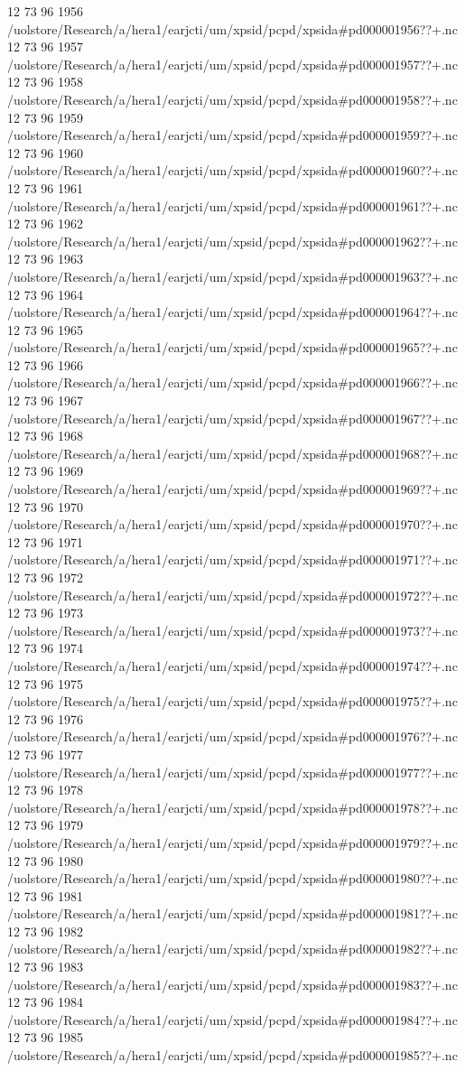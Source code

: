 12 73 96
1956
/uolstore/Research/a/hera1/earjcti/um/xpsid/pcpd/xpsida#pd000001956??+.nc
12 73 96
1957
/uolstore/Research/a/hera1/earjcti/um/xpsid/pcpd/xpsida#pd000001957??+.nc
12 73 96
1958
/uolstore/Research/a/hera1/earjcti/um/xpsid/pcpd/xpsida#pd000001958??+.nc
12 73 96
1959
/uolstore/Research/a/hera1/earjcti/um/xpsid/pcpd/xpsida#pd000001959??+.nc
12 73 96
1960
/uolstore/Research/a/hera1/earjcti/um/xpsid/pcpd/xpsida#pd000001960??+.nc
12 73 96
1961
/uolstore/Research/a/hera1/earjcti/um/xpsid/pcpd/xpsida#pd000001961??+.nc
12 73 96
1962
/uolstore/Research/a/hera1/earjcti/um/xpsid/pcpd/xpsida#pd000001962??+.nc
12 73 96
1963
/uolstore/Research/a/hera1/earjcti/um/xpsid/pcpd/xpsida#pd000001963??+.nc
12 73 96
1964
/uolstore/Research/a/hera1/earjcti/um/xpsid/pcpd/xpsida#pd000001964??+.nc
12 73 96
1965
/uolstore/Research/a/hera1/earjcti/um/xpsid/pcpd/xpsida#pd000001965??+.nc
12 73 96
1966
/uolstore/Research/a/hera1/earjcti/um/xpsid/pcpd/xpsida#pd000001966??+.nc
12 73 96
1967
/uolstore/Research/a/hera1/earjcti/um/xpsid/pcpd/xpsida#pd000001967??+.nc
12 73 96
1968
/uolstore/Research/a/hera1/earjcti/um/xpsid/pcpd/xpsida#pd000001968??+.nc
12 73 96
1969
/uolstore/Research/a/hera1/earjcti/um/xpsid/pcpd/xpsida#pd000001969??+.nc
12 73 96
1970
/uolstore/Research/a/hera1/earjcti/um/xpsid/pcpd/xpsida#pd000001970??+.nc
12 73 96
1971
/uolstore/Research/a/hera1/earjcti/um/xpsid/pcpd/xpsida#pd000001971??+.nc
12 73 96
1972
/uolstore/Research/a/hera1/earjcti/um/xpsid/pcpd/xpsida#pd000001972??+.nc
12 73 96
1973
/uolstore/Research/a/hera1/earjcti/um/xpsid/pcpd/xpsida#pd000001973??+.nc
12 73 96
1974
/uolstore/Research/a/hera1/earjcti/um/xpsid/pcpd/xpsida#pd000001974??+.nc
12 73 96
1975
/uolstore/Research/a/hera1/earjcti/um/xpsid/pcpd/xpsida#pd000001975??+.nc
12 73 96
1976
/uolstore/Research/a/hera1/earjcti/um/xpsid/pcpd/xpsida#pd000001976??+.nc
12 73 96
1977
/uolstore/Research/a/hera1/earjcti/um/xpsid/pcpd/xpsida#pd000001977??+.nc
12 73 96
1978
/uolstore/Research/a/hera1/earjcti/um/xpsid/pcpd/xpsida#pd000001978??+.nc
12 73 96
1979
/uolstore/Research/a/hera1/earjcti/um/xpsid/pcpd/xpsida#pd000001979??+.nc
12 73 96
1980
/uolstore/Research/a/hera1/earjcti/um/xpsid/pcpd/xpsida#pd000001980??+.nc
12 73 96
1981
/uolstore/Research/a/hera1/earjcti/um/xpsid/pcpd/xpsida#pd000001981??+.nc
12 73 96
1982
/uolstore/Research/a/hera1/earjcti/um/xpsid/pcpd/xpsida#pd000001982??+.nc
12 73 96
1983
/uolstore/Research/a/hera1/earjcti/um/xpsid/pcpd/xpsida#pd000001983??+.nc
12 73 96
1984
/uolstore/Research/a/hera1/earjcti/um/xpsid/pcpd/xpsida#pd000001984??+.nc
12 73 96
1985
/uolstore/Research/a/hera1/earjcti/um/xpsid/pcpd/xpsida#pd000001985??+.nc
